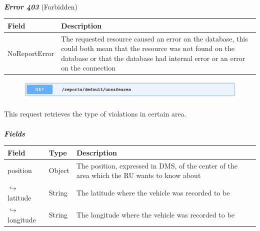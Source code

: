 						\paragraph{}
							\textcolor{myRed}{\textit{\textbf{Error 403}}} (Forbidden)
							\vspace{-2mm}
							\begin{table}[!h]
								\begin{tabular}{L{0.35\textwidth}L{0.57\textwidth}}
									\toprule
									\textbf{Field} & \textbf{Description} \\
									\midrule
								  	 NoReportError & The requested resource caused an error on the database, this could both mean that the resource was not found on the database or that the database had internal error or an error on the connection \\
								 	\bottomrule
								\end{tabular}
							\end{table}
	
							\clearpage
							\begin{figure}[!h]
								\includegraphics[width=\textwidth]{images/Restful/GetUnsafeAreas}
							\end{figure}
						\paragraph{}
						\vspace{-7.5mm}
						This request retrieves the type of violations in certain area.
						\paragraph{}
							\textcolor{myBlue}{\textit{\textbf{Fields}}}
							\vspace{-2mm}
							\begin{table}[!h]
								\begin{tabular}{L{0.2\textwidth}L{0.13\textwidth}L{0.56\textwidth}}
									\toprule
									\textbf{Field} & \textbf{Type} & \textbf{Description} \\
									\midrule
								 	position & Object & The position, expressed in DMS, of the center of the area which the RU wants to know about \\
								 	\hspace{2.5mm}$\hookrightarrow$latitude & String & The latitude where the vehicle was recorded to be \\
								 	\hspace{2.5mm}$\hookrightarrow$longitude & String & The longitude where the vehicle was recorded to be \\
								 	\bottomrule
								\end{tabular}
							\end{table}
